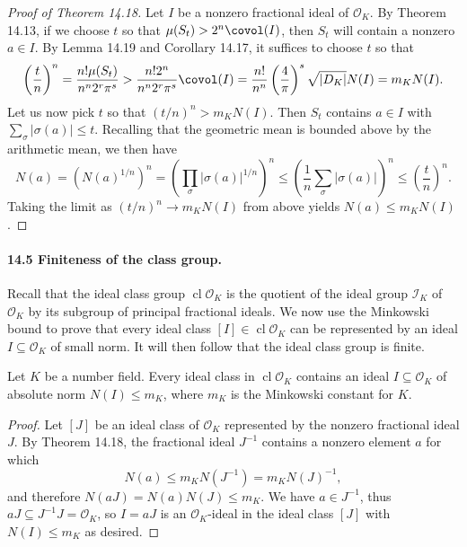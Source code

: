 \begin{proof}[Proof of Theorem 14.18]
Let $I$ be a nonzero fractional ideal of $\mathcal O_K$. By Theorem 14.13, if we choose $t$ so that $\mu(S_t)>2^n\covol(I)$, then $S_t$ will contain a nonzero $a\in I$. By Lemma 14.19 and Corollary 14.17, it suffices to choose $t$ so that
\[
\left(\frac tn\right)^n
=\frac{n!\mu(S_t)}{n^n2^r\pi^s}
>\frac{n!2^n}{n^n2^r\pi^s}\covol(I)
=\frac{n!}{n^n}\left(\frac4\pi\right)^s\sqrt{|D_K|}N(I)
=m_KN(I).
\]
Let us now pick $t$ so that $(t/n)^n>m_KN(I)$. Then $S_t$ contains $a\in I$ with $\sum_\sigma|\sigma(a)|\le t$. Recalling that the geometric mean is bounded above by the arithmetic mean, we then have
\[
N(a)=\left(N(a)^{1/n}\right)^n
=\left(\prod_\sigma|\sigma(a)|^{1/n}\right)^n
\le\left(\frac1n\sum_\sigma|\sigma(a)|\right)^n
\le\left(\frac tn\right)^n.
\]
Taking the limit as $(t/n)^n\to m_KN(I)$ from above yields $N(a)\le m_KN(I)$.
\end{proof}

\paragraph{14.5 Finiteness of the class group.}
Recall that the ideal class group $\operatorname{cl}\mathcal O_K$ is the quotient of the ideal group $\mathcal I_K$ of $\mathcal O_K$ by its subgroup of principal fractional ideals. We now use the Minkowski bound to prove that every ideal class $[I]\in\operatorname{cl}\mathcal O_K$ can be represented by an ideal $I\subseteq\mathcal O_K$ of small norm. It will then follow that the ideal class group is finite.

\begin{theorem}[14.20]
Let $K$ be a number field. Every ideal class in $\operatorname{cl}\mathcal O_K$ contains an ideal $I\subseteq\mathcal O_K$ of absolute norm $N(I)\le m_K$, where $m_K$ is the Minkowski constant for $K$.
\end{theorem}
\begin{proof}
Let $[J]$ be an ideal class of $\mathcal O_K$ represented by the nonzero fractional ideal $J$. By Theorem 14.18, the fractional ideal $J^{-1}$ contains a nonzero element $a$ for which
\[
N(a)\le m_KN(J^{-1})=m_KN(J)^{-1},
\]
and therefore $N(aJ)=N(a)N(J)\le m_K$. We have $a\in J^{-1}$, thus $aJ\subseteq J^{-1}J=\mathcal O_K$, so $I=aJ$ is an $\mathcal O_K$-ideal in the ideal class $[J]$ with $N(I)\le m_K$ as desired.
\end{proof}

